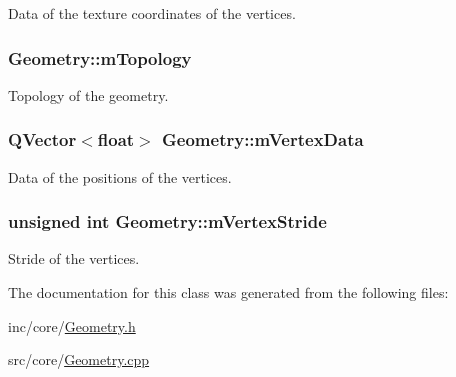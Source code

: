 Data of the texture coordinates of the vertices. 

\hypertarget{class_geometry_acfa146681080dedfb14420ba51b8b52a}{
\subsubsection[{m\+Topology}]{ Geometry\+::m\+Topology\hspace{0.3cm}{\ttfamily [private]}}}\label{class_geometry_acfa146681080dedfb14420ba51b8b52a}


Topology of the geometry. 

\hypertarget{class_geometry_aa1ab4726f4b285d37e98a69f212ac92a}{
\subsubsection[{m\+Vertex\+Data}]{\setlength{\rightskip}{0pt plus 5cm}Q\+Vector$<$float$>$ Geometry\+::m\+Vertex\+Data\hspace{0.3cm}{\ttfamily [private]}}}\label{class_geometry_aa1ab4726f4b285d37e98a69f212ac92a}


Data of the positions of the vertices. 

\hypertarget{class_geometry_aa3d70589b74acec8de5487d1797204a6}{
\subsubsection[{m\+Vertex\+Stride}]{\setlength{\rightskip}{0pt plus 5cm}unsigned int Geometry\+::m\+Vertex\+Stride\hspace{0.3cm}{\ttfamily [private]}}}\label{class_geometry_aa3d70589b74acec8de5487d1797204a6}


Stride of the vertices. 



The documentation for this class was generated from the following files\+:\begin{DoxyCompactItemize}
\item 
inc/core/\hyperlink{_geometry_8h}{Geometry.\+h}\item 
src/core/\hyperlink{_geometry_8cpp}{Geometry.\+cpp}\end{DoxyCompactItemize}

